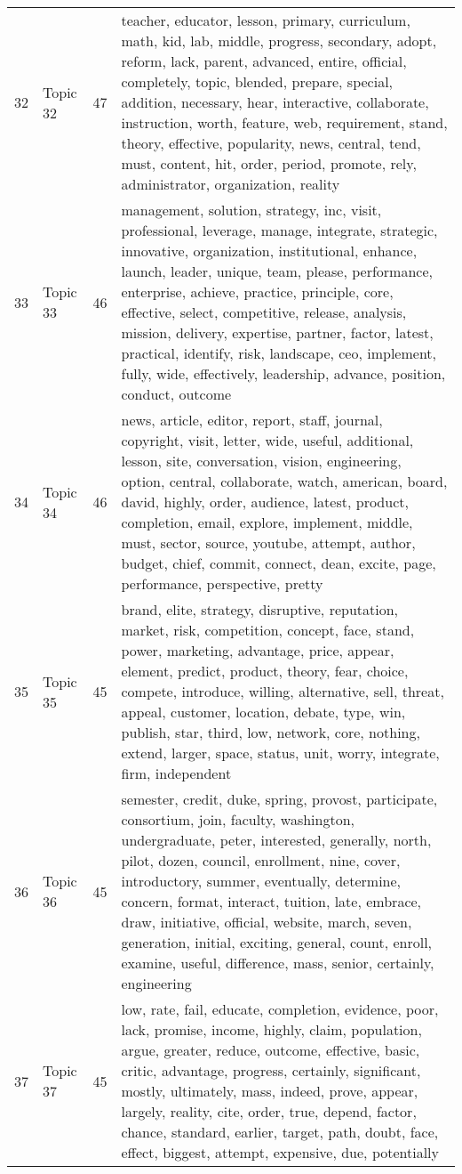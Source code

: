 \begin{table}[ht]
{\begin{tabularx}{\textwidth}{llrX}
   32 & Topic 32 & 47 & teacher, educator, lesson, primary, curriculum, math, kid, lab, middle, progress, secondary, adopt, reform, lack, parent, advanced, entire, official, completely, topic, blended, prepare, special, addition, necessary, hear, interactive, collaborate, instruction, worth, feature, web, requirement, stand, theory, effective, popularity, news, central, tend, must, content, hit, order, period, promote, rely, administrator, organization, reality \\ 
   33 & Topic 33 & 46 & management, solution, strategy, inc, visit, professional, leverage, manage, integrate, strategic, innovative, organization, institutional, enhance, launch, leader, unique, team, please, performance, enterprise, achieve, practice, principle, core, effective, select, competitive, release, analysis, mission, delivery, expertise, partner, factor, latest, practical, identify, risk, landscape, ceo, implement, fully, wide, effectively, leadership, advance, position, conduct, outcome \\ 
   34 & Topic 34 & 46 & news, article, editor, report, staff, journal, copyright, visit, letter, wide, useful, additional, lesson, site, conversation, vision, engineering, option, central, collaborate, watch, american, board, david, highly, order, audience, latest, product, completion, email, explore, implement, middle, must, sector, source, youtube, attempt, author, budget, chief, commit, connect, dean, excite, page, performance, perspective, pretty \\ 
   35 & Topic 35 & 45 & brand, elite, strategy, disruptive, reputation, market, risk, competition, concept, face, stand, power, marketing, advantage, price, appear, element, predict, product, theory, fear, choice, compete, introduce, willing, alternative, sell, threat, appeal, customer, location, debate, type, win, publish, star, third, low, network, core, nothing, extend, larger, space, status, unit, worry, integrate, firm, independent \\ 
   36 & Topic 36 & 45 & semester, credit, duke, spring, provost, participate, consortium, join, faculty, washington, undergraduate, peter, interested, generally, north, pilot, dozen, council, enrollment, nine, cover, introductory, summer, eventually, determine, concern, format, interact, tuition, late, embrace, draw, initiative, official, website, march, seven, generation, initial, exciting, general, count, enroll, examine, useful, difference, mass, senior, certainly, engineering \\ 
   37 & Topic 37 & 45 & low, rate, fail, educate, completion, evidence, poor, lack, promise, income, highly, claim, population, argue, greater, reduce, outcome, effective, basic, critic, advantage, progress, certainly, significant, mostly, ultimately, mass, indeed, prove, appear, largely, reality, cite, order, true, depend, factor, chance, standard, earlier, target, path, doubt, face, effect, biggest, attempt, expensive, due, potentially \\ 

\end{tabularx}}
\end{table}

